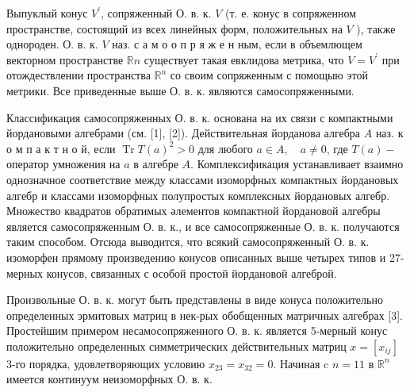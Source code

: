 \documentclass[10pt]{article}
\begin{document}
Выпуклый конус $V^{\prime}$, сопряженный О. в. к. $V$ (т. е. конус в сопряженном пространстве, состоящий из всех линейных форм, положительных на $V$ ), также однороден. О. в. к. $V$ наз. с а м о о п р я ж е н ным, если в объемлющем векторном пространстве $\mathbb{R} n$ существует такая евклидова метрика, что $V=V^{\prime}$ при отождествлении пространства $\mathbb{R}^{n}$ со своим сопряженным с помощыю этой метрики. Все приведенные выше О. в. к. являются самосопряженными.



Классификация самосопряженных О. в. к. основана на их связи с компактными йордановыми алгебрами (см. [1], [2]). Действительная йорданова алгебра $A$ наз. к о м п а к т н о й, если $\operatorname{Tr} T(a)^{2}>0$ для любого $a \in A, \quad a \neq 0$, где $T(a)-$ оператор умножения на $a$ в алгебре $A$. Комплексификация устанавливает взаимно однозначное соответствие между классами изоморфных компактных йордановых алгебр и классами изоморфных полупростых комплексных йордановых алгебр. Множество квадратов обратимых әлементов компактной йордановой алгебры является самосопряженным О. в. к., и все самосопряженные О. в. к. получаются таким способом. Отсюда выводится, что всякий самосопряженный О. в. к. изоморфен прямому произведению конусов описанных выше четырех типов и 27-мерных конусов, связанных с особой простой йордановой алгеброй.



Произвольные О. в. к. могут быть представлены в виде конуса положительно определенных эрмитовых матриц в нек-рых обобщенных матричных алгебрах [3]. Простейшим примером несамосопряженного О. в. к. является 5-мерный конус положительно определенных симметрических действительных матриц $x=\left[x_{i j}\right]$ 3-го порядка, удовлетворяющих условию $x_{23}=x_{32}=0$. Начиная c $n=11$ в $\mathbb{R}^{n}$ имеется континуум неизоморфных О. в. к.
\end{document}
